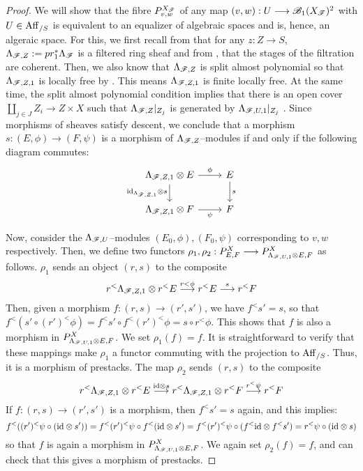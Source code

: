 \documentclass[11pt]{amsart}
\begin{document}
\begin{proof}
We will show that the fibre $P^{X_\mathscr{F}}_{v, w}$ of any map
$(v, w) : U \to \sB_1(X_\sF)^2$ with $U \in \mathrm{Aff}_{/S}$ is equivalent to an
equalizer of algebraic spaces and is, hence, an algeraic space. For this, we
first recall from \cite[\S 2]{ModRepFunGrpI} that for any
$z : Z \to S$, $\Lambda_{\mathscr{F}, Z} := pr_1^*\Lambda_{\mathscr{F}}$ is a filtered
ring sheaf and from \cite[Lemma 2.2]{ModRepFunGrpI}, that the stages of the
filtration are coherent. Then, we also know that $\Lambda_{\mathscr{F}, Z}$ is
split almost polynomial \cite[\S 3.3, \S 5.1]{GeomNonAbHodgeFilt} so that
$\Lambda_{\mathscr{F}, Z, 1}$ is locally free by
\cite[Theorem 2.11]{ModRepFunGrpI}.
This means $\Lambda_{\mathscr{F}, Z, 1}$ is finite locally free.
At the same time, the split almost polynomial condition implies that
there is an open cover $\coprod_{j \in J} Z_i \to Z \times X$ such that
$\Lambda_{\mathscr{F}, Z}|_{Z_j}$ is generated by $\Lambda_{\mathscr{F}, U, 1}|_{Z_j}$
\cite[Proof of Theorem 2.11]{ModRepFunGrpI}. Since morphisms of sheaves
satisfy descent, we conclude that a morphism $s : (E, \phi) \to (F, \psi)$
is a morphism of $\Lambda_{\mathscr{F}, Z}$--modules if and only if the following
diagram commutes:
\[\begin{tikzcd}
\Lambda_{\sF, Z, 1} \otimes E
\ar[r, "\phi"] \ar[d, "\id_{\Lambda_{\sF, Z, 1}} \otimes s" left] &
E \ar[d, "s"] \\
\Lambda_{\sF, Z, 1} \otimes F \ar[r, "\psi" below] & F
\end{tikzcd}\]

Now, consider the $\Lambda_{\mathscr{F}, U}$--modules $(E_0, \phi), (F_0, \psi)$
corresponding to $v, w$ respectively. Then, we define two functors
$\rho_1, \rho_2 : P^X_{E, F} \to P^X_{\Lambda_{\sF, U, 1} \otimes E, F}$
as follows. $\rho_1$ sends an object $(r, s)$ to the composite
\[
r^<\Lambda_{\sF, Z, 1} \otimes r^<E \to[r<\phi] r^<E \to[s] r^<F
\]
Then, given a morphism $f : (r, s) \to (r', s')$, we have $f^<s' = s$, so that
$f^<(s' \circ (r')^<\phi) = f^<s' \circ f^<(r')^<\phi = s \circ r^<\phi$. This
shows that $f$ is also a morphism in $P^X_{\Lambda_{\mathscr{F}, U, 1} \otimes E, F}$.
We set $\rho_1(f) = f$.
It is straightforward to verify that these mappings make $\rho_1$ a functor
commuting with the projection to $\mathrm{Aff}_{/S}$. Thus, it is a morphism of
prestacks.
The map $\rho_2$ sends $(r, s)$ to the composite
\[
r^<\Lambda_{\sF, Z, 1} \otimes r^<E \to[\id \otimes s]
r^<\Lambda_{\sF, Z, 1} \otimes r^<F \to[r^<\psi]
r^<F
\]
If $f : (r, s) \to (r', s')$ is a morphism, then $f^<s' = s$ again, and this
implies:
\[
f^<((r')^<\psi \circ (\mathrm{id} \otimes s'))
= f^<(r')^<\psi \circ f^<(\mathrm{id} \otimes s')
= f^<(r')^<\psi \circ (f^<\mathrm{id} \otimes f^<s')
= r^<\psi \circ (\mathrm{id} \otimes s)
\]
so that $f$ is again a morphism in $P^X_{\Lambda_{\mathscr{F}, U, 1} \otimes E, F}$.
We again set $\rho_2(f) = f$, and can check that this gives a morphism of
prestacks.


\end{proof}
\end{document}
